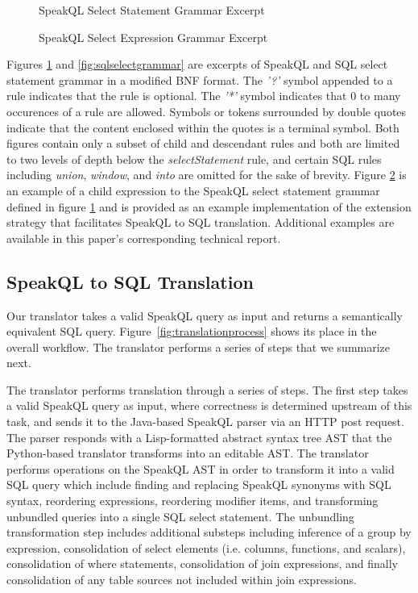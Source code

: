 \begin{figure}
\selectStatementTable
\caption{SpeakQL Select Statement Grammar Excerpt}
\label{fig:speakqlselectgrammar}
\end{figure}

\begin{figure}
\selectExpressionTable
\caption{SpeakQL Select Expression Grammar Excerpt}
\label{fig:selectexprgrammar}
\end{figure}

Figures \ref{fig:speakqlselectgrammar} and \ref{fig:sqlselectgrammar} are excerpts of SpeakQL and SQL select statement grammar in a modified BNF format. The \emph{'?'} symbol appended to a rule indicates that the rule is optional. The \emph{'*'} symbol indicates that 0 to many occurences of a rule are allowed. Symbols or tokens surrounded by double quotes indicate that the content enclosed within the quotes is a terminal symbol. Both figures contain only a subset of child and descendant rules and both are limited to two levels of depth below the \emph{selectStatement} rule, and certain SQL rules including \emph{union}, \emph{window}, and \emph{into} are omitted for the sake of brevity. Figure \ref{fig:selectexprgrammar} is an example of a child expression to the SpeakQL select statement grammar defined in figure \ref{fig:speakqlselectgrammar} and is provided as an example implementation of the extension strategy that facilitates SpeakQL to SQL translation. Additional examples are available in this paper's corresponding technical report.

\subsection{SpeakQL to SQL Translation}

Our translator takes a valid SpeakQL query as input and returns a semantically equivalent SQL query. Figure~\ref{fig:translationprocess} shows its place in the overall workflow. 
The translator performs a series of steps that we summarize next. 

The translator performs translation through a series of steps. The first step takes a valid SpeakQL query as input, where correctness is determined upstream of this task, and sends it to the Java-based SpeakQL parser via an HTTP post request. The parser responds with a Lisp-formatted abstract syntax tree AST that the Python-based translator transforms into an editable AST. The translator performs operations on the SpeakQL AST in order to transform it into a valid SQL query which include finding and replacing SpeakQL synonyms with SQL syntax, reordering expressions, reordering modifier items, and transforming unbundled queries into a single SQL select statement. The unbundling transformation step includes additional substeps including inference of a group by expression, consolidation of select elements (i.e. columns, functions, and scalars), consolidation of where statements, consolidation of join expressions, and finally consolidation of any table sources not included within join expressions.

